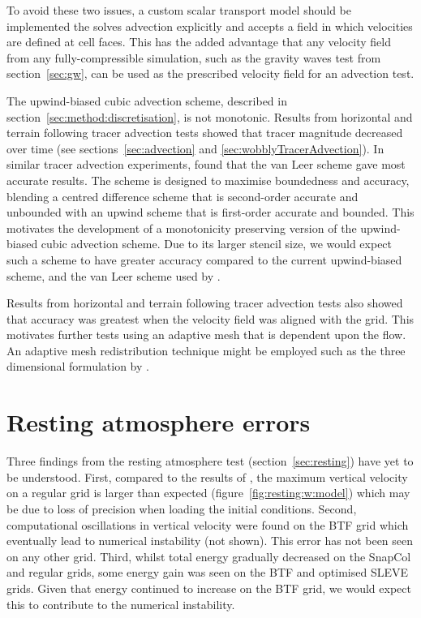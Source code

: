 To avoid these two issues, a custom scalar transport model should be implemented the solves advection explicitly and accepts a field in which velocities are defined at cell faces.  This has the added advantage that any velocity field from any fully-compressible simulation, such as the gravity waves test from section~\ref{sec:gw}, can be used as the prescribed velocity field for an advection test.

The upwind-biased cubic advection scheme, described in section~\ref{sec:method:discretisation}, is not monotonic.  Results from horizontal and terrain following tracer advection tests showed that tracer magnitude decreased over time (see sections~\ref{sec:advection} and \ref{sec:wobblyTracerAdvection}).
In similar tracer advection experiments, \textcite{jones2013} found that the van Leer scheme gave most accurate results.  The scheme is designed to maximise boundedness and accuracy, blending a centred difference scheme that is second-order accurate and unbounded with an upwind scheme that is first-order accurate and bounded.  This motivates the development of a monotonicity preserving version of the upwind-biased cubic advection scheme.  Due to its larger stencil size, we would expect such a scheme to have greater accuracy compared to the current upwind-biased scheme, and the van Leer scheme used by \textcite{jones2013}.

Results from horizontal and terrain following tracer advection tests also showed that accuracy was greatest when the velocity field was aligned with the grid.  This motivates further tests using an adaptive mesh that is dependent upon the flow.  An adaptive mesh redistribution technique might be employed such as the three dimensional formulation by \textcite{browne2014}.

\section{Resting atmosphere errors}
\label{sec:further-work:resting}

Three findings from the resting atmosphere test (section~\ref{sec:resting}) have yet to be understood.  First, compared to the results of \textcite{good2013}, the maximum vertical velocity on a regular grid is larger than expected (figure~\ref{fig:resting:w:model}) which may be due to loss of precision when loading the initial conditions.
Second, computational oscillations in vertical velocity were found on the BTF grid which eventually lead to numerical instability (not shown).  This error has not been seen on any other grid.
Third, whilst total energy gradually decreased on the SnapCol and regular grids, some energy gain was seen on the BTF and optimised SLEVE grids.  Given that energy continued to increase on the BTF grid, we would expect this to contribute to the numerical instability.


